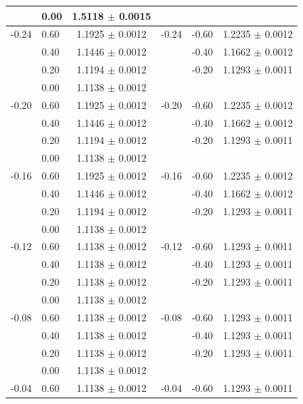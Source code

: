 \begin{table}[h]
\begin{center}
\begin{tabular}{l l c | l l c}
      & 0.00 & 1.5118 $\pm$ 0.0015 &       &       &                     \\ \hline
-0.24 & 0.60 & 1.1925 $\pm$ 0.0012 & -0.24 & -0.60 & 1.2235 $\pm$ 0.0012 \\ 
      & 0.40 & 1.1446 $\pm$ 0.0012 &       & -0.40 & 1.1662 $\pm$ 0.0012 \\ 
      & 0.20 & 1.1194 $\pm$ 0.0012 &       & -0.20 & 1.1293 $\pm$ 0.0011 \\ 
      & 0.00 & 1.1138 $\pm$ 0.0012 &       &       &                     \\ \hline
-0.20 & 0.60 & 1.1925 $\pm$ 0.0012 & -0.20 & -0.60 & 1.2235 $\pm$ 0.0012 \\ 
      & 0.40 & 1.1446 $\pm$ 0.0012 &       & -0.40 & 1.1662 $\pm$ 0.0012 \\ 
      & 0.20 & 1.1194 $\pm$ 0.0012 &       & -0.20 & 1.1293 $\pm$ 0.0011 \\ 
      & 0.00 & 1.1138 $\pm$ 0.0012 &       &       &                     \\ \hline
-0.16 & 0.60 & 1.1925 $\pm$ 0.0012 & -0.16 & -0.60 & 1.2235 $\pm$ 0.0012 \\ 
      & 0.40 & 1.1446 $\pm$ 0.0012 &       & -0.40 & 1.1662 $\pm$ 0.0012 \\ 
      & 0.20 & 1.1194 $\pm$ 0.0012 &       & -0.20 & 1.1293 $\pm$ 0.0011 \\ 
      & 0.00 & 1.1138 $\pm$ 0.0012 &       &       &                     \\ \hline
-0.12 & 0.60 & 1.1138 $\pm$ 0.0012 & -0.12 & -0.60 & 1.1293 $\pm$ 0.0011 \\ 
      & 0.40 & 1.1138 $\pm$ 0.0012 &       & -0.40 & 1.1293 $\pm$ 0.0011 \\
      & 0.20 & 1.1138 $\pm$ 0.0012 &       & -0.20 & 1.1293 $\pm$ 0.0011 \\ 
      & 0.00 & 1.1138 $\pm$ 0.0012 &       &       &                      \\ \hline
-0.08 & 0.60 & 1.1138 $\pm$ 0.0012 & -0.08 & -0.60 & 1.1293 $\pm$ 0.0011 \\ 
      & 0.40 & 1.1138 $\pm$ 0.0012 &       & -0.40 & 1.1293 $\pm$ 0.0011 \\ 
      & 0.20 & 1.1138 $\pm$ 0.0012 &       & -0.20 & 1.1293 $\pm$ 0.0011 \\ 
      & 0.00 & 1.1138 $\pm$ 0.0012 &       &       &                      \\ \hline
-0.04 & 0.60 & 1.1138 $\pm$ 0.0012 & -0.04 & -0.60 & 1.1293 $\pm$ 0.0011 \\ 

\end{tabular}
\end{center}
\end{table}

